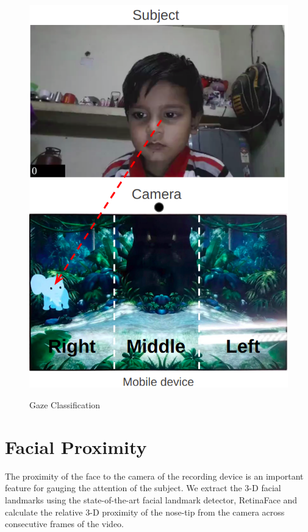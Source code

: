 \begin{figure}[h]
{{        \includegraphics[scale=0.3]{Introduction/3wayGazeClassif}
        \label{fig:3wayGazeClassif}
    }}
    \caption{Gaze Classification}
\end{figure}


\section{Facial Proximity}
The proximity of the face to the camera of the recording device is an important feature for gauging the attention of the subject. We extract the 3-D facial landmarks using the state-of-the-art facial landmark detector, RetinaFace \citep{retinaFace2020} and calculate the relative 3-D proximity of the nose-tip from the camera across consecutive frames of the video.

